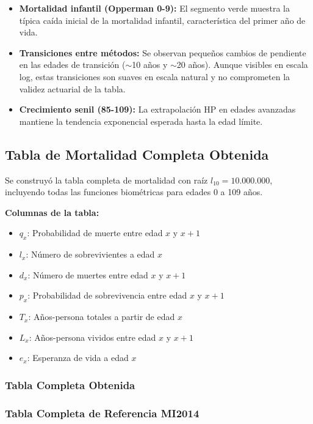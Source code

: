\begin{itemize}
    \item \textbf{Mortalidad infantil (Opperman 0-9):} El segmento verde muestra la típica caída inicial de la mortalidad infantil, característica del primer año de vida.
    \item \textbf{Transiciones entre métodos:} Se observan pequeños cambios de pendiente en las edades de transición ($\sim$10 años y $\sim$20 años). Aunque visibles en escala log, estas transiciones son suaves en escala natural y no comprometen la validez actuarial de la tabla.
    \item \textbf{Crecimiento senil (85-109):} La extrapolación HP en edades avanzadas mantiene la tendencia exponencial esperada hasta la edad límite.
\end{itemize}

\subsection{Tabla de Mortalidad Completa Obtenida}

Se construyó la tabla completa de mortalidad con raíz $l_{10} = 10.000.000$, incluyendo todas las funciones biométricas para edades 0 a 109 años.

\textbf{Columnas de la tabla:}
\begin{itemize}
    \item $q_x$: Probabilidad de muerte entre edad $x$ y $x+1$
    \item $l_x$: Número de sobrevivientes a edad $x$
    \item $d_x$: Número de muertes entre edad $x$ y $x+1$
    \item $p_x$: Probabilidad de sobrevivencia entre edad $x$ y $x+1$
    \item $T_x$: Años-persona totales a partir de edad $x$
    \item $L_x$: Años-persona vividos entre edad $x$ y $x+1$
    \item $e_x$: Esperanza de vida a edad $x$
\end{itemize}

\clearpage


\subsubsection{Tabla Completa Obtenida}



\subsubsection{Tabla Completa de Referencia MI2014}




\clearpage

